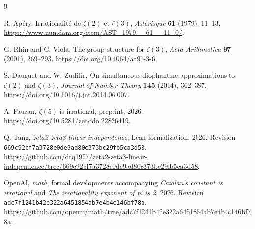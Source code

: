 \documentclass[11pt]{article}
\numberwithin{equation}{section}
\begin{document}
\begin{thebibliography}{9}
\raggedright
{}
R. Ap\'ery, Irrationalit\'e de $\zeta(2)$ et $\zeta(3)$,
\emph{Ast\'erisque} \textbf{61} (1979), 11--13.
\url{https://www.numdam.org/item/AST_1979__61__11_0/}.

G. Rhin and C. Viola, The group structure for $\zeta(3)$,
\emph{Acta Arithmetica} \textbf{97} (2001), 269--293.
\url{https://doi.org/10.4064/aa97-3-6}.

S. Dauguet and W. Zudilin, On simultaneous diophantine approximations
to $\zeta(2)$ and $\zeta(3)$,
\emph{Journal of Number Theory} \textbf{145} (2014), 362--387.
\url{https://doi.org/10.1016/j.jnt.2014.06.007}.

A. Fauzan, $\zeta(5)$ is irrational, preprint, 2026.
\url{https://doi.org/10.5281/zenodo.22826419}.

Q. Tang, \emph{zeta2-zeta3-linear-independence}, Lean formalization,
2026. Revision \texttt{669c92bf7a3728e0de9ad80c373bc29fb5ca3d58}.
\url{https://github.com/dtq1997/zeta2-zeta3-linear-independence/tree/669c92bf7a3728e0de9ad80c373bc29fb5ca3d58}.

OpenAI, \emph{math}, formal developments accompanying
\emph{Catalan's constant is irrational} and
\emph{The irrationality exponent of pi is 2}, 2026.
Revision \texttt{adc7f1241b42e322a6451854ab7e4b4c146bf78a}.
\url{https://github.com/openai/math/tree/adc7f1241b42e322a6451854ab7e4b4c146bf78a}.
\end{thebibliography}
\end{document}

